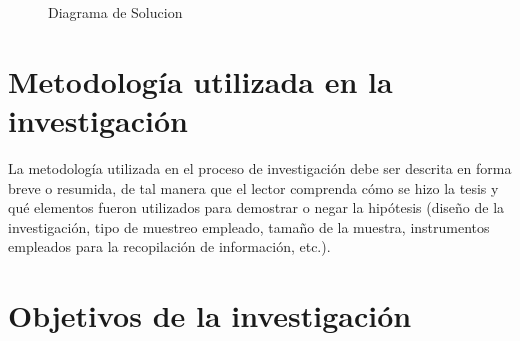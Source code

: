 \begin{figure}
	\centering
	
	\caption{Diagrama de Solucion} \label{fig:DiagramaDeSolucion} 
\end{figure}

\newpage



\section{Metodología utilizada en la investigación}
La metodología utilizada en el proceso de investigación debe ser descrita en forma breve o resumida, de tal manera que el lector comprenda cómo se hizo la tesis y qué elementos fueron utilizados para demostrar o negar la hipótesis (diseño de la investigación, tipo de muestreo empleado, tamaño de la muestra, instrumentos empleados para la recopilación de información, etc.).


\newpage




\section{Objetivos de la investigación}

